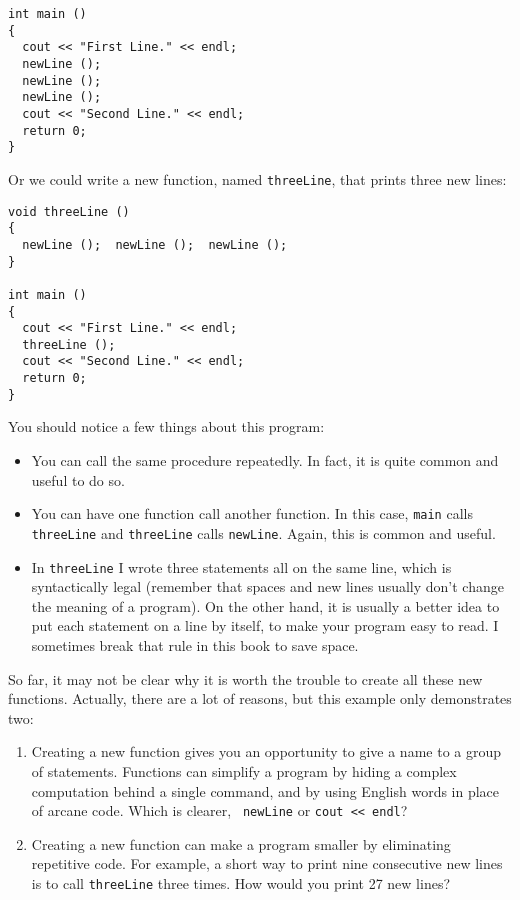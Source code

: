 \begin{verbatim}
int main ()
{
  cout << "First Line." << endl;
  newLine ();
  newLine ();
  newLine ();
  cout << "Second Line." << endl;
  return 0;
}
\end{verbatim}
%
Or we could write a new function, named {\tt threeLine}, that 
prints three new lines:

\begin{verbatim}
void threeLine ()
{
  newLine ();  newLine ();  newLine ();
}

int main ()
{
  cout << "First Line." << endl;
  threeLine ();
  cout << "Second Line." << endl;
  return 0;
}
\end{verbatim}
%
You should notice a few things about this program:

\begin{itemize}

\item You can call the same procedure repeatedly.  In
fact, it is quite common and useful to do so.

\item You can have one function call another function.  In this
case, {\tt main} calls {\tt threeLine} and {\tt threeLine}
calls {\tt newLine}.  Again, this is common and useful.

\item In {\tt threeLine} I wrote three statements all on the
same line, which is syntactically legal (remember that spaces
and new lines usually don't change the meaning of a program).
On the other hand, it is usually a better idea to put each
statement on a line by itself, to make your program easy to
read.  I sometimes break that rule in this book to save space.

\end{itemize}

So far, it may not be clear why it is worth the trouble to
create all these new functions.  Actually, there are a lot
of reasons, but this example only demonstrates two:

\begin{enumerate}

\item Creating a new function gives you an opportunity to
give a name to a group of statements.  Functions can simplify a program
by hiding a complex computation behind a single command, and by using
English words in place of arcane code.  Which is clearer, {\tt
newLine} or {\tt cout << endl}?

\item Creating a new function can make a program smaller by eliminating
repetitive code.  For example, a short way to print nine consecutive
new lines is to call {\tt threeLine} three times.  How would you
print 27 new lines?

\end{enumerate}

